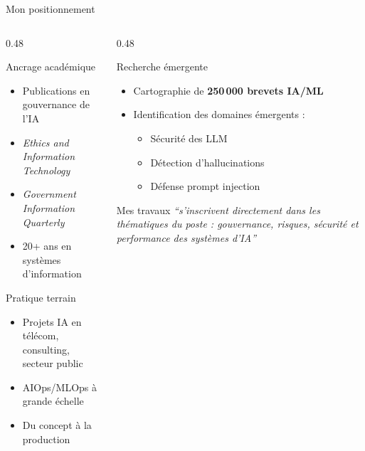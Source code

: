 \documentclass[aspectratio=169,11pt]{beamer}
\begin{document}
\begin{frame}{Mon positionnement}
  \begin{columns}[T]
    \begin{column}{0.48\textwidth}
      \begin{block}{Ancrage académique}
        \begin{itemize}\small
          \item Publications en gouvernance de l'IA
          \item \textit{Ethics and Information Technology}
          \item \textit{Government Information Quarterly}
          \item 20+ ans en systèmes d'information
        \end{itemize}
      \end{block}
      
      \begin{block}{Pratique terrain}
        \begin{itemize}\small
          \item Projets IA en télécom, consulting, secteur public
          \item AIOps/MLOps à grande échelle
          \item Du concept à la production
        \end{itemize}
      \end{block}
    \end{column}
    \begin{column}{0.48\textwidth}
      \begin{block}{Recherche émergente}
        \begin{itemize}\small
          \item Cartographie de \textbf{250\,000 brevets IA/ML}
          \item Identification des domaines émergents :
          \begin{itemize}\footnotesize
            \item Sécurité des LLM
            \item Détection d'hallucinations
            \item Défense prompt injection
          \end{itemize}
        \end{itemize}
      \end{block}
      
      \vspace{0.3em}
      
      \begin{exampleblock}{Mes travaux}
        \small\textit{``s'inscrivent directement dans les thématiques du poste : gouvernance, risques, sécurité et performance des systèmes d'IA''}
      \end{exampleblock}
    \end{column}
  \end{columns}
\end{frame}
\end{document}

